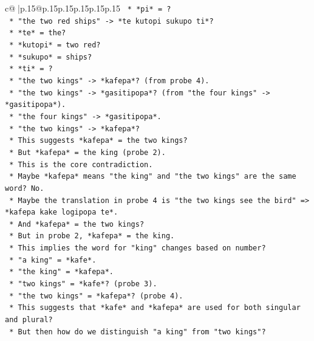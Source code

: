 \documentclass{article}
\begin{document}
{\begin{supertabular}{c@{$\;$}|p{.15\linewidth}@{}p{.15\linewidth}p{.15\linewidth}p{.15\linewidth}p{.15\linewidth}p{.15\linewidth}}
{{{\texttt{                *   *pi* = ?} \\
\texttt{            *   "the two red ships" {-}> *te kutopi sukupo ti*?} \\
\texttt{                *   *te* = the?} \\
\texttt{                *   *kutopi* = two red?} \\
\texttt{                *   *sukupo* = ships?} \\
\texttt{                *   *ti* = ?} \\
\texttt{            *   "the two kings" {-}> *kafepa*? (from probe 4).} \\
\texttt{            *   "the two kings" {-}> *gasitipopa*? (from "the four kings" {-}> *gasitipopa*).} \\
\texttt{                *   "the four kings" {-}> *gasitipopa*.} \\
\texttt{                *   "the two kings" {-}> *kafepa*?} \\
\texttt{                *   This suggests *kafepa* = the two kings?} \\
\texttt{                *   But *kafepa* = the king (probe 2).} \\
\texttt{                *   This is the core contradiction.} \\
\texttt{                *   Maybe *kafepa* means "the king" and "the two kings" are the same word? No.} \\
\texttt{                *   Maybe the translation in probe 4 is "the two kings see the bird" => *kafepa kake logipopa te*.} \\
\texttt{                *   And *kafepa* = the two kings?} \\
\texttt{                *   But in probe 2, *kafepa* = the king.} \\
\texttt{                *   This implies the word for "king" changes based on number?} \\
\texttt{                *   "a king" = *kafe*.} \\
\texttt{                *   "the king" = *kafepa*.} \\
\texttt{                *   "two kings" = *kafe*? (probe 3).} \\
\texttt{                *   "the two kings" = *kafepa*? (probe 4).} \\
\texttt{                *   This suggests that *kafe* and *kafepa* are used for both singular and plural?} \\
\texttt{                *   But then how do we distinguish "a king" from "two kings"?} \\
}}}
\end{supertabular}}
\end{document}
